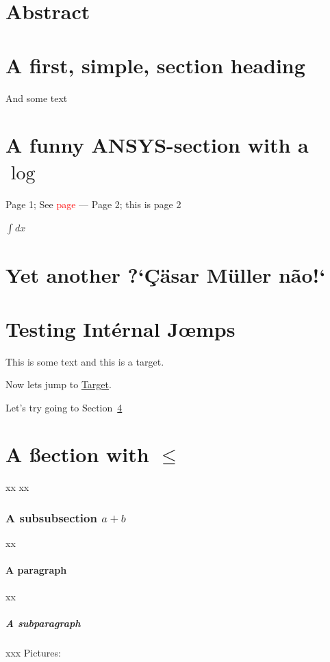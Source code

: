 \documentclass[]{article}
\newcommand{\ANS}{\textsf{ANSYS}\xspace}
\begin{document}
\tableofcontents
\section*{Abstract}
\section{A first, simple, section heading}
And some text
\section{A funny \ANS-section with a \texorpdfstring{$\log$}{log}}
Page 1; See \textcolor{red}{page} --\pageref{page2}--
\newpage
Page 2; this is page 2\label{page2}
\newpage
{}





$\int\!dx$
\section{Yet another ?`\c C\"asar M\"uller n\~ao!`}

\section{Testing Int\'ernal J\oe mps}\label{ss:intjmps}

This is some text and this is a \hypertarget{target}{target}.

\newpage

Now lets jump to \hyperlink{target}{Target}.

Let's try going to Section~\ref{ss:intjmps}

\section{A \ss ection with $\leq$}
xx
xx
\subsubsection{A subsubsection \texorpdfstring{$a+b$}{a+b}}
xx
\paragraph{A paragraph}
xx
\subparagraph{A subparagraph}
xxx
Pictures:
\end{document}
